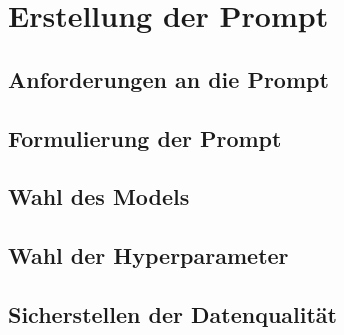 \section{Erstellung der Prompt}

\subsection{Anforderungen an die Prompt}

\subsection{Formulierung der Prompt}


\subsection{Wahl des Models}


\subsection{Wahl der Hyperparameter}


\subsection{Sicherstellen der Datenqualität}

